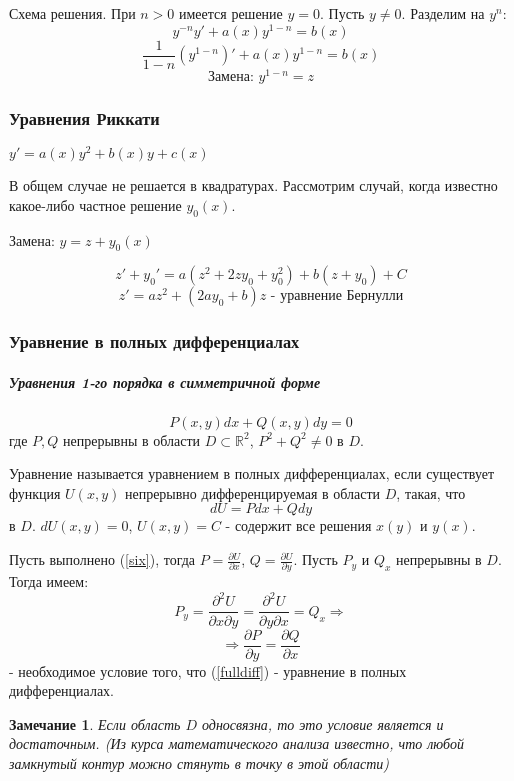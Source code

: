 \documentclass{article}
\newtheorem*{ntc}{Замечание}
\begin{document}
  \noindent Схема решения.  
  При $n > 0$ имеется решение $y = 0$.
  Пусть $y \neq 0$. Разделим на $y^n$:
  $$ y^{-n}y' + a(x)y^{1 - n} = b(x) $$
  $$ \frac{1}{1 - n}(y^{1-n})' + a(x)y^{1 - n} = b(x) $$
  $$ \text{Замена: } y^{1 -n} = z $$
  
  \subsubsection{Уравнения Риккати}
  $ \boxed{y' = a(x)y^2 + b(x) y + c(x)} $ 
  
  \noindent В общем случае не решается в квадратурах. Рассмотрим случай, когда известно какое-либо частное решение $y_0(x)$. 
  
  \noindent Замена: $y = z + y_0(x)$
  
  $$ z' + y_0' = a(z^2 + 2zy_0 + y_0^2) + b(z + y_0) + C $$
  $$ z' = az^2 + (2ay_0 + b)z \text{ - уравнение Бернулли} $$
  
  \subsubsection{Уравнение в полных дифференциалах}
  \subparagraph*{Уравнения 1-го порядка в симметричной форме}  
  \begin{equation} 
  \label{fulldiff}
  \boxed{P(x, y)dx + Q(x,y)dy = 0}
  \end{equation} 
  где $P, Q$ непрерывны в области $D \subset \mathbb{R}^2$, $P^2 + Q^2 \neq 0$ в $D$. 
  
  Уравнение называется уравнением в полных дифференциалах, если существует функция $U(x, y)$ непрерывно дифференцируемая в области $D$, такая, что 
  \begin{equation}
  \label{six}
  dU = Pdx + Qdy
  \end{equation} 
  в $D$. $dU(x,y) = 0$, $U(x, y) = C$ - содержит все решения $x(y)$ и $y(x)$.
  
  Пусть выполнено (\ref{six}), тогда $ P = \frac{\partial U}{\partial x} $, $ Q = \frac{\partial U}{\partial y} $.
  Пусть $P_y$ и $Q_x$ непрерывны в $D$. Тогда имеем:
  $$ P_y = \frac{\partial^2 U}{\partial x \partial y} = \frac{\partial^2 U}{\partial y \partial x} = Q_x \Rightarrow $$
  $$ \Rightarrow \frac{\partial P}{\partial y} = \frac{\partial Q}{\partial x} $$ 
   - необходимое условие того, что (\ref{fulldiff}) - уравнение в полных дифференциалах.
  
  \begin{ntc}
  Если область $D$ односвязна, то это условие является и достаточным. (Из курса математического анализа известно, что любой замкнутый контур можно стянуть в точку в этой области)
  \end{ntc}
\end{document}
